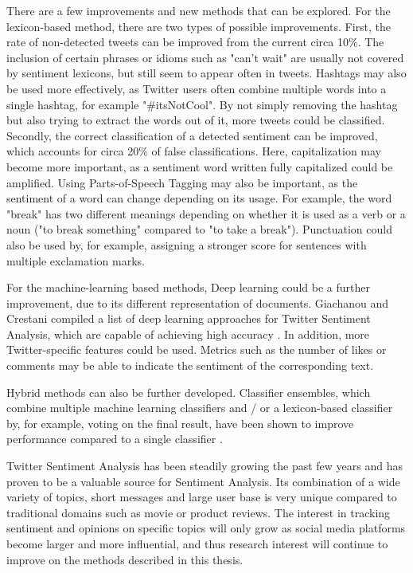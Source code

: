 There are a few improvements and new methods that can be explored. For the lexicon-based method, there are two types of possible improvements. First, the rate of non-detected tweets can be improved from the current circa 10\%. The inclusion of certain phrases or idioms such as "can't wait" are usually not covered by sentiment lexicons, but still seem to appear often in tweets. Hashtags may also be used more effectively, as Twitter users often combine multiple words into a single hashtag, for example "\#itsNotCool". By not simply removing the hashtag but also trying to extract the words out of it, more tweets could be classified. Secondly, the correct classification of a detected sentiment can be improved, which accounts for circa 20\% of false classifications. Here, capitalization may become more important, as a sentiment word written fully capitalized could be amplified. Using Parts-of-Speech Tagging may also be important, as the sentiment of a word can change depending on its usage. For example, the word "break" has two different meanings depending on whether it is used as a verb or a noun ("to break something" compared to "to take a break"). Punctuation could also be used by, for example, assigning a stronger score for sentences with multiple exclamation marks.

For the machine-learning based methods, Deep learning could be a further improvement, due to its different representation of documents. Giachanou and Crestani compiled a list of deep learning approaches for Twitter Sentiment Analysis, which are capable of achieving high accuracy \cite{DBLP:journals/csur/GiachanouC16}. In addition, more Twitter-specific features could be used. Metrics such as the number of likes or comments may be able to indicate the sentiment of the corresponding text.

Hybrid methods can also be further developed. Classifier ensembles, which combine multiple machine learning classifiers and / or a lexicon-based classifier by, for example, voting on the final result, have been shown to improve performance compared to a single classifier \cite{DBLP:journals/csur/GiachanouC16}.

Twitter Sentiment Analysis has been steadily growing the past few years and has proven to be a valuable source for Sentiment Analysis. Its combination of a wide variety of topics, short messages and large user base is very unique compared to traditional domains such as movie or product reviews. The interest in tracking sentiment and opinions on specific topics will only grow as social media platforms become larger and more influential, and thus research interest will continue to improve on the methods described in this thesis.

